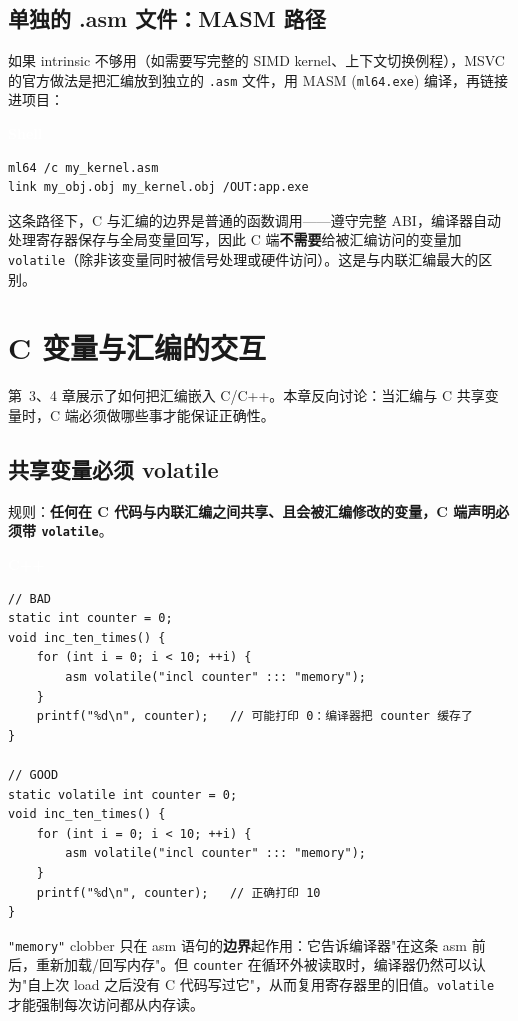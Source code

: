 \documentclass[12pt,a4paper,fontset=fandol]{ctexbook}
\newcommand{\cpplabel}{%
  \begin{tcolorbox}[enhanced,colback=cppheadbg,colframe=cppheadbg,
    arc=1mm,boxrule=0mm,left=6pt,right=6pt,top=2pt,bottom=2pt,
    halign=left,oversize]
    \textcolor{white}{\small\bfseries C++}
  \end{tcolorbox}\vspace{-4pt}}
\newcommand{\bashlabel}{%
  \begin{tcolorbox}[enhanced,colback=black!80,colframe=black!80,
    arc=1mm,boxrule=0mm,left=6pt,right=6pt,top=2pt,bottom=2pt,
    halign=left,oversize]
    \textcolor{white}{\small\bfseries Shell}
  \end{tcolorbox}\vspace{-4pt}}
\newcommand{\cpp}[1]{C++#1}
\newcommand{\kw}[1]{\texttt{#1}}
\begin{document}
\section{单独的 .asm 文件：MASM 路径}\label{sec:masm}

如果 intrinsic 不够用（如需要写完整的 SIMD kernel、上下文切换例程），MSVC 的官方做法是把汇编放到独立的 \texttt{.asm} 文件，用 MASM (\texttt{ml64.exe}) 编译，再链接进项目：

\bashlabel
\begin{lstlisting}[style=bashstyle]
ml64 /c my_kernel.asm
link my_obj.obj my_kernel.obj /OUT:app.exe
\end{lstlisting}

这条路径下，C 与汇编的边界是普通的函数调用——遵守完整 ABI，编译器自动处理寄存器保存与全局变量回写，因此 C 端\textbf{不需要}给被汇编访问的变量加 \kw{volatile}（除非该变量同时被信号处理或硬件访问）。这是与内联汇编最大的区别。

\chapter{C 变量与汇编的交互}\label{ch:c-asm-interact}

第~3、4 章展示了如何把汇编嵌入 C/\allowbreak{}\cpp{}。本章反向讨论：当汇编与 C 共享变量时，C 端必须做哪些事才能保证正确性。

\section{共享变量必须 volatile}\label{sec:shared-must-volatile}

规则：\textbf{任何在 C 代码与内联汇编之间共享、且会被汇编修改的变量，C 端声明必须带 \kw{volatile}}。

\cpplabel
\begin{lstlisting}[style=cppstyle]
// BAD
static int counter = 0;
void inc_ten_times() {
    for (int i = 0; i < 10; ++i) {
        asm volatile("incl counter" ::: "memory");
    }
    printf("%d\n", counter);   // 可能打印 0：编译器把 counter 缓存了
}

// GOOD
static volatile int counter = 0;
void inc_ten_times() {
    for (int i = 0; i < 10; ++i) {
        asm volatile("incl counter" ::: "memory");
    }
    printf("%d\n", counter);   // 正确打印 10
}
\end{lstlisting}

\texttt{"memory"} clobber 只在 asm 语句的\textbf{边界}起作用：它告诉编译器"在这条 asm 前后，重新加载/回写内存"。但 \texttt{counter} 在循环外被读取时，编译器仍然可以认为"自上次 load 之后没有 C 代码写过它"，从而复用寄存器里的旧值。\kw{volatile} 才能强制每次访问都从内存读。
\end{document}
